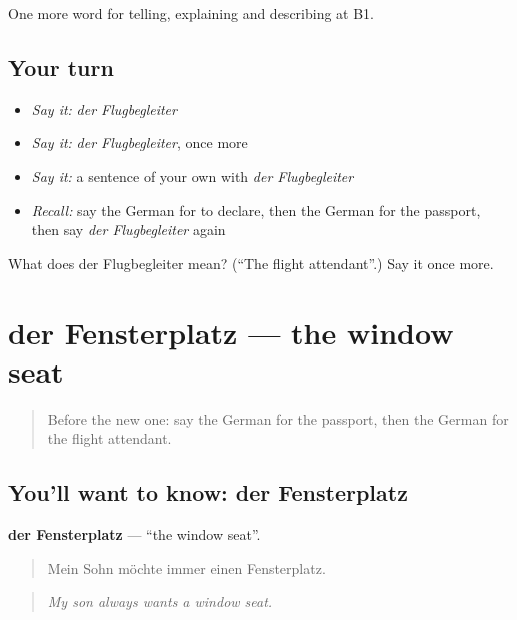 \begin{grammarlens}[title={What you've built}]
One more word for telling, explaining and describing at B1.
\end{grammarlens}

\subsection*{Your turn}
\begin{itemize}
\raggedright
  \item \emph{Say it:} \emph{der Flugbegleiter}
  \item \emph{Say it:} \emph{der Flugbegleiter}, once more
  \item \emph{Say it:} a sentence of your own with \emph{der Flugbegleiter}
  \item \emph{Recall:} say the German for to declare, then the German for the passport, then say \emph{der Flugbegleiter} again
\end{itemize}

\begin{tcolorbox}[breakable,colback=teal!4,colframe=teal!35!black,title={Before you move on}]
What does der Flugbegleiter mean? (\textquotedblleft{}The flight attendant\textquotedblright{}.) Say it once more.
\end{tcolorbox}
\section[der Fensterplatz]{der Fensterplatz — the window seat}

\label{lesson:GE-C418-fensterplatz}



\begin{quote}
Before the new one: say the German for the passport, then the German for the flight attendant.
\end{quote}

\subsection*{You'll want to know: der Fensterplatz}
\textbf{der Fensterplatz} — \textquotedblleft{}the window seat\textquotedblright{}.

\begin{quote}
Mein Sohn möchte immer einen Fensterplatz.
\end{quote}

\begin{quote}
\emph{My son always wants a window seat.}
\end{quote}

